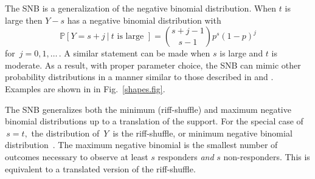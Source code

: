 \documentclass[12pt]{article}
\begin{document}
The SNB is a generalization of the negative 
binomial distribution. When $t$ is large then $Y-s$ has a 
negative binomial distribution with
\begin{equation*}                                    %
\mathbb{P}[Y=s+j\ |\ t \text{ is large\ }]        \label{nb1.eq}          
  = {{s+j-1}\choose{s-1}} p^s (1-p)^j
\end{equation*}
for $\,j=0, 1,\ldots\,$. A similar statement can be made when $s$ is large
and $t$ is moderate. As a result, with proper parameter choice, the SNB
can mimic other probability distributions in a manner similar to 
those described in \cite{Peizer1968} and \cite{Best1974}. Examples are
shown in in Fig.~\ref{shapes.fig}. 

The SNB generalizes both the minimum (riff-shuffle) and maximum negative
binomial distributions up to a translation of the support.
For the special case of $\,s=t,$ the distribution of $\,Y\,$ is the
riff-shuffle, or minimum negative binomial 
distribution~\citep{Uppuluri1967,Johnson2005}.
The maximum negative binomial \cite{Johnson2005,Zhang2000,Zelterman2005} is 
the smallest number of outcomes necessary to 
observe at least $s$ responders {\em and} $s$ non-responders. This is equivalent
to a translated version of the riff-shuffle. 

\end{document}
